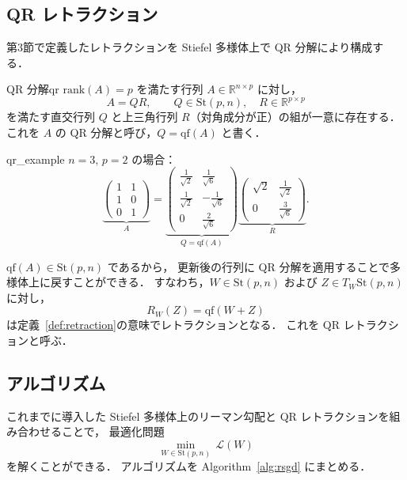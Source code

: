 \documentclass[uplatex, dvipdfmx]{jsarticle}
\begin{document}
\subsection{QR レトラクション}

第3節で定義したレトラクションを Stiefel 多様体上で QR 分解により構成する．

\begin{definition}{QR 分解}{qr}
$\mathrm{rank}(A)=p$ を満たす行列 $A\in\mathbb{R}^{n\times p}$ に対し，
\[
A = QR,
\qquad Q\in\mathrm{St}(p,n),\quad R\in\mathbb{R}^{p\times p}
\]
を満たす直交行列 $Q$ と上三角行列 $R$（対角成分が正）の組が一意に存在する．
これを $A$ の QR 分解と呼び，$Q=\mathrm{qf}(A)$ と書く．
\end{definition}

\begin{example}{}{qr_example}
$n=3,\, p=2$ の場合：
\[
\underbrace{
\begin{pmatrix}
1 & 1 \\
1 & 0 \\
0 & 1
\end{pmatrix}
}_{A}
=
\underbrace{
\begin{pmatrix}
\frac{1}{\sqrt{2}} & \frac{1}{\sqrt{6}} \\[4pt]
\frac{1}{\sqrt{2}} & -\frac{1}{\sqrt{6}} \\[4pt]
0 & \frac{2}{\sqrt{6}}
\end{pmatrix}
}_{Q=\mathrm{qf}(A)}
\underbrace{
\begin{pmatrix}
\sqrt{2} & \frac{1}{\sqrt{2}} \\[4pt]
0 & \frac{3}{\sqrt{6}}
\end{pmatrix}
}_{R}.
\]
\end{example}

$\mathrm{qf}(A)\in\mathrm{St}(p,n)$ であるから，
更新後の行列に QR 分解を適用することで多様体上に戻すことができる．
すなわち，$W\in\mathrm{St}(p,n)$ および $Z\in T_W\mathrm{St}(p,n)$ に対し，
\[
R_W(Z) = \mathrm{qf}(W+Z)
\]
は定義~\ref{def:retraction}の意味でレトラクションとなる．
これを QR レトラクションと呼ぶ．

\subsection{アルゴリズム}

これまでに導入した Stiefel 多様体上のリーマン勾配と QR レトラクションを組み合わせることで，
最適化問題
\[
\min_{W\in\mathrm{St}(p,n)}\, \mathcal{L}(W)
\]
を解くことができる．
アルゴリズムを Algorithm~\ref{alg:rsgd} にまとめる．
\end{document}
